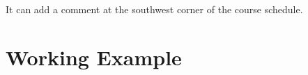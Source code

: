 \documentclass[10pt, letterpaper]{l3doc}
\begin{document}
\begin{function}{\more}
  \begin{syntax}
     
  \end{syntax}
  It can add a comment at the southwest corner of the course schedule.
\end{function}

\clearpage \appendix \linespread{1.25}

\section{Working Example} \label{mwe}




\end{document}
